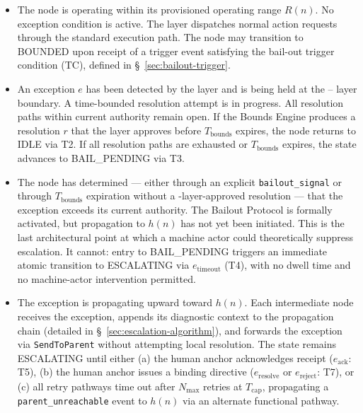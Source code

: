 \begin{itemize}\itemsep=0pt
\item[\textbf{IDLE.}] The node is operating within its provisioned operating range $R(n)$. No exception condition is active. The \fact{} layer dispatches normal action requests through the standard execution path. The node may transition to BOUNDED upon receipt of a trigger event satisfying the bail-out trigger condition (TC), defined in \S~\ref{sec:bailout-trigger}.

\item[\textbf{BOUNDED.}] An exception $e$ has been detected by the \bounds{} layer and is being held at the \bounds{}--\fact{} layer boundary. A time-bounded resolution attempt is in progress. All resolution paths within current authority remain open. If the Bounds Engine produces a resolution $r$ that the \fact{} layer approves before $T_{\text{bounds}}$ expires, the node returns to IDLE via T2. If all resolution paths are exhausted or $T_{\text{bounds}}$ expires, the state advances to BAIL\_PENDING via T3.

\item[\textbf{BAIL\_PENDING.}] The node has determined --- either through an explicit \texttt{bailout\_signal} or through $T_{\text{bounds}}$ expiration without a \fact-layer-approved resolution --- that the exception exceeds its current authority. The Bailout Protocol is formally activated, but propagation to $h(n)$ has not yet been initiated. This is the last architectural point at which a machine actor could theoretically suppress escalation. It cannot: entry to BAIL\_PENDING triggers an immediate atomic transition to ESCALATING via $e_{\text{timeout}}$ (T4), with no dwell time and no machine-actor intervention permitted.

\item[\textbf{ESCALATING.}] The exception is propagating upward toward $h(n)$. Each intermediate node receives the exception, appends its diagnostic context to the propagation chain (detailed in \S~\ref{sec:escalation-algorithm}), and forwards the exception via \texttt{SendToParent} without attempting local resolution. The state remains ESCALATING until either (a) the human anchor acknowledges receipt ($e_{\text{ack}}$: T5), (b) the human anchor issues a binding directive ($e_{\text{resolve}}$ or $e_{\text{reject}}$: T7), or (c) all retry pathways time out after $N_{\max}$ retries at $T_{\text{cap}}$, propagating a \texttt{parent\_unreachable} event to $h(n)$ via an alternate functional pathway.


\end{itemize}
